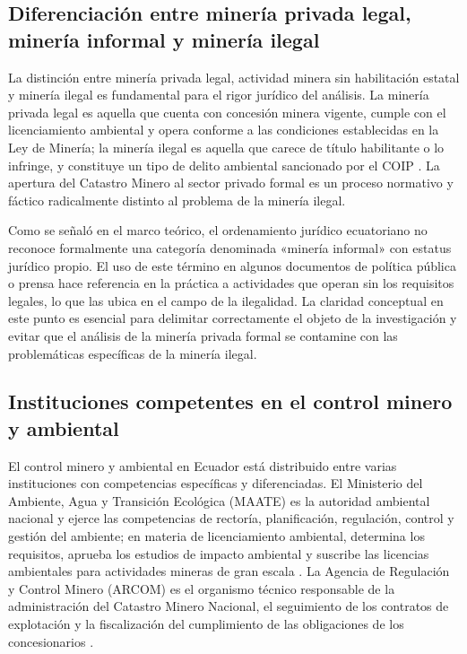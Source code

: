 \subsection{Diferenciación entre minería privada legal, minería informal y minería ilegal}

La distinción entre minería privada legal, actividad minera sin habilitación estatal y minería ilegal es fundamental para el rigor jurídico del análisis. La minería privada legal es aquella que cuenta con concesión minera vigente, cumple con el licenciamiento ambiental y opera conforme a las condiciones establecidas en la Ley de Minería; la minería ilegal es aquella que carece de título habilitante o lo infringe, y constituye un tipo de delito ambiental sancionado por el COIP \parencite{coip_2014,ley_mineria_2025}. La apertura del Catastro Minero al sector privado formal es un proceso normativo y fáctico radicalmente distinto al problema de la minería ilegal.

Como se señaló en el marco teórico, el ordenamiento jurídico ecuatoriano no reconoce formalmente una categoría denominada «minería informal» con estatus jurídico propio. El uso de este término en algunos documentos de política pública o prensa hace referencia en la práctica a actividades que operan sin los requisitos legales, lo que las ubica en el campo de la ilegalidad. La claridad conceptual en este punto es esencial para delimitar correctamente el objeto de la investigación y evitar que el análisis de la minería privada formal se contamine con las problemáticas específicas de la minería ilegal.

\subsection{Instituciones competentes en el control minero y ambiental}

El control minero y ambiental en Ecuador está distribuido entre varias instituciones con competencias específicas y diferenciadas. El Ministerio del Ambiente, Agua y Transición Ecológica (MAATE) es la autoridad ambiental nacional y ejerce las competencias de rectoría, planificación, regulación, control y gestión del ambiente; en materia de licenciamiento ambiental, determina los requisitos, aprueba los estudios de impacto ambiental y suscribe las licencias ambientales para actividades mineras de gran escala \parencite{coa_2017}. La Agencia de Regulación y Control Minero (ARCOM) es el organismo técnico responsable de la administración del Catastro Minero Nacional, el seguimiento de los contratos de explotación y la fiscalización del cumplimiento de las obligaciones de los concesionarios \parencite{ley_mineria_2025,arcom_rendicion_cuentas_2024}.

